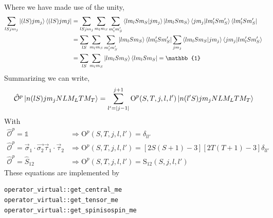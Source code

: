 \documentclass[10pt]{article}
\begin{document}
Where we have made use of the unity,
\begin{align*}
\sum_{l S j m_j} \ket{ (l S) j m_j} \bra{ (l S) j mj} &= \sum_{l S j m_j} \sum_{ m_l m_S} \sum_{m_l' m_S'} \braket{ l m_l S m_S | j m_j } \ket{ l m_l S m_S} \braket{ j m_j | l m_l' S m_S'} \bra{ l m_l' S m_S'} \\
&= \sum_{l S} \sum_{ m_l m_S} \sum_{m_l' m_S'}  \ket{ l m_l S m_S}  \bra{ l m_l' S m_S'} \sum_{j m_j} \braket{ l m_l S m_S | j m_j } \braket{ j m_j | l m_l' S m_S'} \\
&=  \sum_{l S} \sum_{ m_l m_S} \ket{ l m_l S m_S}  \bra{ l m_l S m_S} = \mathbb{1}
\end{align*}
Summarizing we can write,
\begin{align*}
	\hat{\mathcal{O}}^{p} \ket{ n (lS) j m_j N L M_L T M_T } = \sum_{l' = |j-1|}^{j+1} \text{O}^{p}(S,T,j,l,l') \ket{ n (l'S) j m_j N L M_L T M_T }
\end{align*}
With
\begin{align}
	\hat{\mathcal{O}}^{p} = \mathbb{1} & \Rightarrow  \text{O}^{p}(S,T,j,l,l') = \delta_{l l'} \\
	\hat{\mathcal{O}}^{p} = \vec{\sigma}_{1} \cdot \vec{\sigma_{2}} \vec{ \tau}_{1} \cdot \vec{ \tau}_{2} & \Rightarrow  \text{O}^{p}(S,T,j,l,l') = [ 2S(S+1) - 3 ] [ 2T(T+1) - 3] \delta_{l l'}\\
	\hat{\mathcal{O}}^{p} =  \hat{S}_{12} &\Rightarrow \text{O}^{p}(S,T,j,l,l') = \text{S}_{12}(S,j,l,l')
\end{align}
These equations are implemented by
\begin{verbatim}
operator_virtual::get_central_me
operator_virtual::get_tensor_me
operator_virtual::get_spinisospin_me
\end{verbatim}
\end{document}
